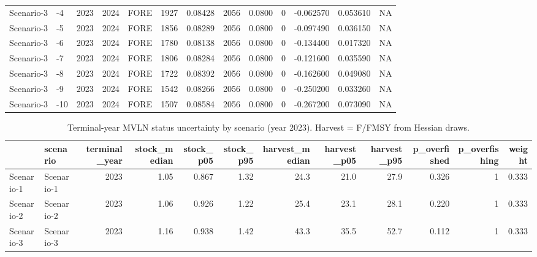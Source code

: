 \begin{table}
\begin{tabular}[t]{llrrlrrrrrrrr}
\addlinespace
Scenario-3 & -4 & 2023 & 2024 & FORE & 1927 & 0.08428 & 2056 & 0.0800 & 0 & -0.062570 & 0.053610 & NA\\
Scenario-3 & -5 & 2023 & 2024 & FORE & 1856 & 0.08289 & 2056 & 0.0800 & 0 & -0.097490 & 0.036150 & NA\\
Scenario-3 & -6 & 2023 & 2024 & FORE & 1780 & 0.08138 & 2056 & 0.0800 & 0 & -0.134400 & 0.017320 & NA\\
Scenario-3 & -7 & 2023 & 2024 & FORE & 1806 & 0.08284 & 2056 & 0.0800 & 0 & -0.121600 & 0.035590 & NA\\
Scenario-3 & -8 & 2023 & 2024 & FORE & 1722 & 0.08392 & 2056 & 0.0800 & 0 & -0.162600 & 0.049080 & NA\\
\addlinespace
Scenario-3 & -9 & 2023 & 2024 & FORE & 1542 & 0.08266 & 2056 & 0.0800 & 0 & -0.250200 & 0.033260 & NA\\
Scenario-3 & -10 & 2023 & 2024 & FORE & 1507 & 0.08584 & 2056 & 0.0800 & 0 & -0.267200 & 0.073090 & NA\\
\bottomrule
\end{tabular}
\end{table}

\begin{table}

\caption{\label{tab:robustness-mvln-terminal}Terminal-year MVLN status uncertainty by scenario (year 2023). Harvest = F/FMSY from Hessian draws.}
\centering
\begin{tabular}[t]{llrrrrrrrrrr}
\toprule
  & scenario & terminal\_year & stock\_median & stock\_p05 & stock\_p95 & harvest\_median & harvest\_p05 & harvest\_p95 & p\_overfished & p\_overfishing & weight\\
\midrule
Scenario-1 & Scenario-1 & 2023 & 1.05 & 0.867 & 1.32 & 24.3 & 21.0 & 27.9 & 0.326 & 1 & 0.333\\
Scenario-2 & Scenario-2 & 2023 & 1.06 & 0.926 & 1.22 & 25.4 & 23.1 & 28.1 & 0.220 & 1 & 0.333\\
Scenario-3 & Scenario-3 & 2023 & 1.16 & 0.938 & 1.42 & 43.3 & 35.5 & 52.7 & 0.112 & 1 & 0.333\\
\bottomrule
\end{tabular}
\end{table}

